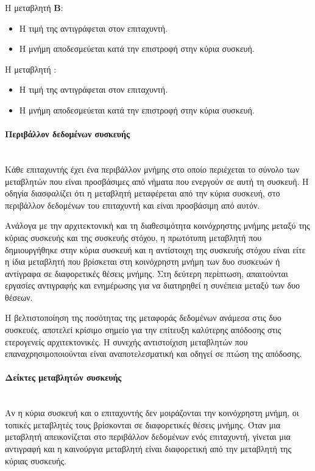 Η μεταβλητή \textbf{Β}:

\begin{itemize}
  \item Η τιμή της αντιγράφεται στον επιταχυντή.
  \item Η μνήμη αποδεσμεύεται κατά την επιστροφή στην κύρια συσκευή.
\end{itemize}

Η μεταβλητή \textbf{}:

\begin{itemize}
  \item Η τιμή της αντιγράφεται στον επιταχυντή.
  \item Η μνήμη αποδεσμεύεται κατά την επιστροφή στην κύρια συσκευή.
\end{itemize}

\paragraph{Περιβάλλον δεδομένων συσκευής}
\ \\
Κάθε επιταχυντής έχει ένα περιβάλλον μνήμης στο οποίο περιέχεται το σύνολο των μεταβλητών που είναι προσβάσιμες από νήματα που ενεργούν σε αυτή τη συσκευή. Η οδηγία \emph{} διασφαλίζει ότι η μεταβλητή μεταφέρεται από την κύρια συσκευή, στο περιβάλλον δεδομένων του επιταχυντή και είναι προσβάσιμη από αυτόν.

Ανάλογα με την αρχιτεκτονική και τη διαθεσιμότητα κοινόχρηστης μνήμης μεταξύ της κύριας συσκευής\emph{} και της συσκευής στόχου, η πρωτότυπη μεταβλητή που δημιουργήθηκε στην κύρια συσκευή και η αντίστοιχη της συσκευής στόχου είναι είτε η ίδια μεταβλητή που βρίσκεται στη κοινόχρηστη μνήμη των δυο συσκευών ή αντίγραφα σε διαφορετικές θέσεις μνήμης. Στη δεύτερη περίπτωση, απαιτούνται εργασίες αντιγραφής και ενημέρωσης για να διατηρηθεί η συνέπεια μεταξύ των δυο θέσεων.

Η βελτιστοποίηση της ποσότητας της μεταφοράς δεδομένων ανάμεσα στις δυο συσκευές, αποτελεί κρίσιμο σημείο για την επίτευξη καλύτερης απόδοσης στις ετερογενείς αρχιτεκτονικές.
Η συνεχής αντιστοίχιση μεταβλητών που επαναχρησιμοποιούνται είναι αναποτελεσματική και οδηγεί σε πτώση της απόδοσης.

\paragraph{Δείκτες μεταβλητών συσκευής}
\ \\
Αν η κύρια συσκευή και ο επιταχυντής δεν μοιράζονται την κοινόχρηστη μνήμη, οι τοπικές μεταβλητές τους βρίσκονται σε διαφορετικές θέσεις μνήμης. Όταν μια μεταβλητή απεικονίζεται στο περιβάλλον δεδομένων ενός επιταχυντή, γίνεται μια αντιγραφή και η καινούργια μεταβλητή είναι διαφορετική από την μεταβλητή της κύριας συσκευής.

